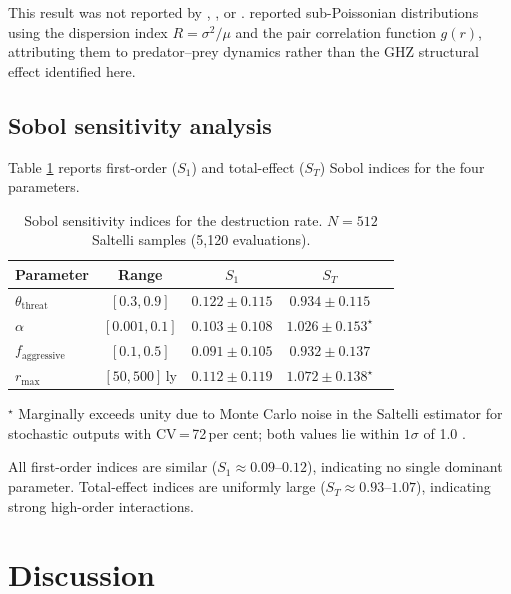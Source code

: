 \documentclass[useAMS,usenatbib]{mn2e}
\begin{document}
This result was not reported by \citet{forgan2009},
\citet{forgan2011}, or \citet{foucher2023}.
\citet{foucher2023} reported sub-Poissonian distributions using
the dispersion index $R = \sigma^2/\mu$ and the pair correlation
function $g(r)$, attributing them to predator--prey dynamics
rather than the GHZ structural effect identified here.

\subsection{Sobol sensitivity analysis}
\label{sec:sobol_results}

Table \ref{tab:sobol} reports first-order ($S_1$) and
total-effect ($S_T$) Sobol indices for the four parameters.

\begin{table}
  \centering
  \caption{Sobol sensitivity indices for the destruction rate.
           $N = 512$ Saltelli samples (5{,}120 evaluations).}
  \label{tab:sobol}
  \begin{tabular}{lcccc}
    \toprule
    Parameter & Range & $S_1$ & $S_T$ \\
    \midrule
    $\theta_\text{threat}$ & $[0.3,0.9]$     & $0.122\pm0.115$ & $0.934\pm0.115$ \\
    $\alpha$               & $[0.001,0.1]$   & $0.103\pm0.108$ & $1.026\pm0.153^\star$ \\
    $f_\text{aggressive}$  & $[0.1,0.5]$     & $0.091\pm0.105$ & $0.932\pm0.137$ \\
    $r_\text{max}$         & $[50,500]$\,ly  & $0.112\pm0.119$ & $1.072\pm0.138^\star$ \\
    \bottomrule
  \end{tabular}
  \begin{flushleft}
    \footnotesize
    $^\star$ Marginally exceeds unity due to Monte Carlo noise in the
    Saltelli estimator for stochastic outputs with CV\,=\,72\,per cent;
    both values lie within $1\sigma$ of 1.0 \citep{saltelli2010}.
  \end{flushleft}
\end{table}

All first-order indices are similar ($S_1 \approx 0.09$--$0.12$),
indicating no single dominant parameter.
Total-effect indices are uniformly large ($S_T \approx 0.93$--$1.07$),
indicating strong high-order interactions.

\section{Discussion}
\label{sec:discussion}
\end{document}
